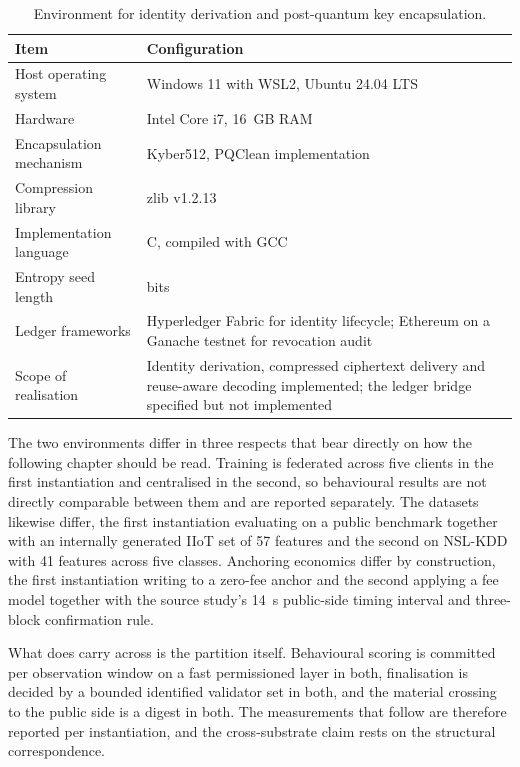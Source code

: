 \begin{table}[!htbp]
  \centering
  \footnotesize
  \setlength{\tabcolsep}{5pt}
  \renewcommand{\arraystretch}{1.3}
  \caption{Environment for identity derivation and post-quantum key encapsulation.}
  \label{tab:env-identity}
  \begin{tabularx}{\textwidth}{@{}
      >{\raggedright\arraybackslash}p{4.4cm}
      >{\raggedright\arraybackslash}X@{}}
    \toprule
    \textbf{Item} & \textbf{Configuration} \\
    \midrule
    Host operating system & Windows 11 with WSL2, Ubuntu 24.04 LTS \\
    Hardware & Intel Core i7, 16~GB RAM \\
    Encapsulation mechanism & Kyber512, PQClean implementation \\
    Compression library & zlib v1.2.13 \\
    Implementation language & C, compiled with GCC \\
    Entropy seed length & 512 bits \\
    Ledger frameworks & Hyperledger Fabric for identity lifecycle; Ethereum on a Ganache testnet for revocation audit \\
    Scope of realisation & Identity derivation, compressed ciphertext delivery and reuse-aware decoding implemented; the ledger bridge specified but not implemented \\
    \bottomrule
  \end{tabularx}
\end{table}
The two environments differ in three respects that bear directly on how the following chapter should be read. Training is federated across five clients in the first instantiation and centralised in the second, so behavioural results are not directly comparable between them and are reported separately. The datasets likewise differ, the first instantiation evaluating on a public benchmark together with an internally generated IIoT set of 57 features and the second on NSL-KDD with 41 features across five classes. Anchoring economics differ by construction, the first instantiation writing to a zero-fee anchor and the second applying a fee model together with the source study's 14~s public-side timing interval and three-block confirmation rule.

What does carry across is the partition itself. Behavioural scoring is committed per observation window on a fast permissioned layer in both, finalisation is decided by a bounded identified validator set in both, and the material crossing to the public side is a digest in both. The measurements that follow are therefore reported per instantiation, and the cross-substrate claim rests on the structural correspondence.

